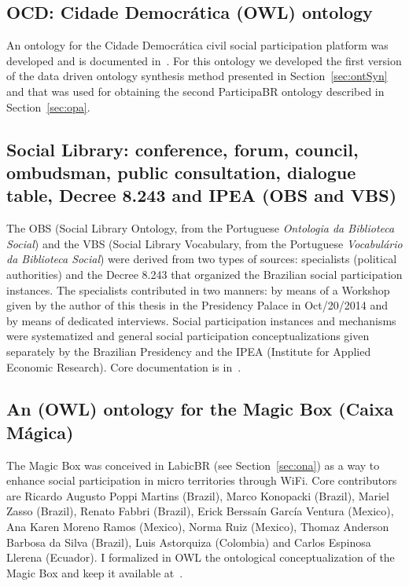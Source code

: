 \begin{apendicesenv}
\subsection{OCD: Cidade Democrática (OWL) ontology}
An ontology for the Cidade Democrática civil social participation platform was developed and is documented in~\cite{opa,ocd}.
For this ontology we developed the first version of the data driven ontology synthesis method presented in Section~\ref{sec:ontSyn}
and that was used for obtaining the second ParticipaBR ontology described in Section~\ref{sec:opa}.

\subsection{Social Library: conference, forum, council, ombudsman, public consultation, dialogue table, Decree 8.243 and IPEA (OBS and VBS)}
The OBS (Social Library Ontology, from the Portuguese \emph{Ontologia da Biblioteca Social})
and the VBS (Social Library Vocabulary, from the Portuguese \emph{Vocabulário da Biblioteca Social})
were derived from two types of sources: specialists (political authorities)
and the Decree 8.243 that organized the Brazilian social participation instances.
The specialists contributed in two manners: by means of a Workshop given by the author 
of this thesis in the Presidency Palace in Oct/20/2014
and by means of dedicated interviews.
Social participation instances and mechanisms were systematized and general
social participation conceptualizations given separately by the Brazilian Presidency
and the IPEA (Institute for Applied Economic Research).
Core documentation is in~\cite{opa,vocabP}.

\subsection{An (OWL) ontology for the Magic Box (Caixa Mágica)}\label{sec:mb}
The Magic Box was conceived in LabicBR (see Section~\ref{sec:ona}) as a way to enhance social participation
in micro territories through WiFi.
Core contributors are Ricardo Augusto Poppi Martins (Brazil), Marco Konopacki (Brazil),
Mariel Zasso (Brazil), Renato Fabbri (Brazil), Erick Berssaín García Ventura (Mexico),
Ana Karen Moreno Ramos (Mexico), Norma Ruiz (Mexico),
Thomaz Anderson Barbosa da Silva (Brazil), Luis Astorquiza (Colombia) and Carlos Espinosa Llerena (Ecuador).
I formalized in OWL the ontological conceptualization of the Magic Box and keep it available at~\cite{caixamagica}.


\end{apendicesenv}
